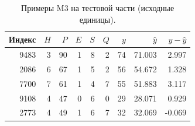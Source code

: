 \begin{table}[H]\centering\small
\begin{tabular}{rrrrrrrrr}\toprule
Индекс & $H$ & $P$ & $E$ & $S$ & $Q$ & $y$ & $\widehat y$ & $y-\widehat y$\\\midrule
9483 & 3 & 90 & 1 & 8 & 2 & 74 & 71.003 & 2.997\\
2086 & 6 & 67 & 1 & 5 & 2 & 56 & 54.672 & 1.328\\
7700 & 7 & 61 & 1 & 4 & 7 & 55 & 51.883 & 3.117\\
9108 & 4 & 47 & 0 & 6 & 0 & 29 & 28.071 & 0.929\\
2773 & 4 & 49 & 1 & 6 & 7 & 32 & 32.069 & -0.069\\
\bottomrule\end{tabular}
\caption{Примеры M3 на тестовой части (исходные единицы).}
\label{tab:examples}
\end{table}
